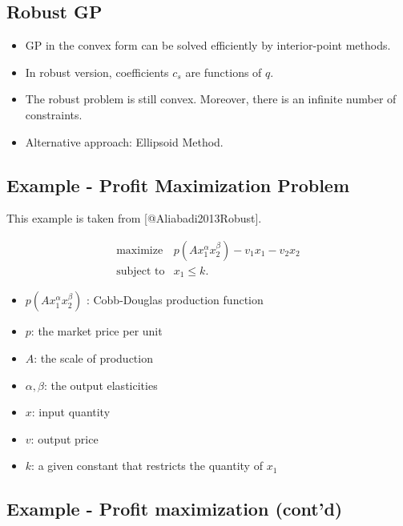 \documentclass[
]{article}
\providecommand{\tightlist}{%
  \setlength{\itemsep}{0pt}\setlength{\parskip}{0pt}}
\begin{document}
\hypertarget{robust-gp}{%
\subsection{Robust GP}\label{robust-gp}}

\begin{itemize}
\tightlist
\item
  GP in the convex form can be solved efficiently by interior-point methods.
\item
  In robust version, coefficients \(c_s\) are functions of \(q\).
\item
  The robust problem is still convex. Moreover, there is an infinite number of constraints.
\item
  Alternative approach: Ellipsoid Method.
\end{itemize}

\hypertarget{example---profit-maximization-problem}{%
\subsection{Example - Profit Maximization Problem}\label{example---profit-maximization-problem}}

This example is taken from {[}@Aliabadi2013Robust{]}.

\[\begin{array}{ll}
   \text{maximize} & p(A x_1^\alpha x_2^\beta) - v_1 x_1 - v_2 x_2 \\
   \text{subject to}& x_1 \le k.
\end{array}\]

\begin{itemize}
\tightlist
\item
  \(p(A x_1^\alpha x_2^\beta)\) : Cobb-Douglas production function
\item
  \(p\): the market price per unit
\item
  \(A\): the scale of production
\item
  \(\alpha, \beta\): the output elasticities
\item
  \(x\): input quantity
\item
  \(v\): output price
\item
  \(k\): a given constant that restricts the quantity of \(x_1\)
\end{itemize}

\hypertarget{example---profit-maximization-contd}{%
\subsection{Example - Profit maximization (cont'd)}\label{example---profit-maximization-contd}}
\end{document}
